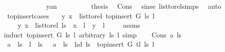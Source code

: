 \begin{isabellebody}
\ \ \ \ \isamarkupfalse%
\isanewline
\ \ \ \ \ \ \isamarkupfalse%
\ yan\isanewline
\ \ \ \ \ \ \isamarkupfalse%
\ \isamarkupfalse%
\ {\isacharquery}{\kern0pt}thesis\ \isamarkupfalse%
\ Cons\ \isamarkupfalse%
\ sinse\ list{\isacharunderscore}{\kern0pt}to{\isacharunderscore}{\kern0pt}rel{\isachardot}{\kern0pt}simps\ \isamarkupfalse%
\ auto\ \isanewline
\ \ \ \ \isamarkupfalse%
\isanewline
\ \ \isamarkupfalse%
\isanewline
{}\isamarkupfalse%
%
\endisatagproof
{\isafoldproof}%
%
\isadelimproof
\isanewline
%
\endisadelimproof
\isanewline
{}\isamarkupfalse%
\ top{\isacharunderscore}{\kern0pt}insert{\isacharunderscore}{\kern0pt}cases{\isacharcolon}{\kern0pt}\isanewline
\ \ \ {\isachardoublequoteopen}{\isacharparenleft}{\kern0pt}y{\isacharcomma}{\kern0pt}\ x{\isacharparenright}{\kern0pt}\ {\isasymin}\ list{\isacharunderscore}{\kern0pt}to{\isacharunderscore}{\kern0pt}rel\ {\isacharparenleft}{\kern0pt}top{\isacharunderscore}{\kern0pt}insert\ G\ ls\ l{\isacharparenright}{\kern0pt}{\isachardoublequoteclose}\isanewline
\ \ \ \ {\isachardoublequoteopen}{\isacharparenleft}{\kern0pt}y{\isacharcomma}{\kern0pt}\ x{\isacharparenright}{\kern0pt}\ {\isasymin}\ list{\isacharunderscore}{\kern0pt}to{\isacharunderscore}{\kern0pt}rel\ ls\ {\isasymor}\ x\ {\isacharequal}{\kern0pt}\ l\ {\isasymor}\ y\ {\isacharequal}{\kern0pt}\ l{\isachardoublequoteclose}\ \isanewline
%
\isadelimproof
\ \ %
\endisadelimproof
%
\isatagproof
{}\isamarkupfalse%
\ assms\ \isanewline
{}\isamarkupfalse%
{\isacharparenleft}{\kern0pt}induct\ {\isachardoublequoteopen}{\isacharparenleft}{\kern0pt}top{\isacharunderscore}{\kern0pt}insert\ G\ ls\ l{\isacharparenright}{\kern0pt}{\isachardoublequoteclose}\ arbitrary{\isacharcolon}{\kern0pt}\ ls\ l{\isacharcomma}{\kern0pt}\ simp{\isacharparenright}{\kern0pt}\isanewline
\ \ \isamarkupfalse%
\ {\isacharparenleft}{\kern0pt}Cons\ a\ ls{}{\isacharparenright}{\kern0pt}\isanewline
\ \ \isamarkupfalse%
\ {\isachardoublequoteopen}a\ {\isacharhash}{\kern0pt}\ ls{}\ {\isacharequal}{\kern0pt}\ l\ {\isacharhash}{\kern0pt}\ ls{\isachardoublequoteclose}\ {\isacharbar}{\kern0pt}\ \ {\isachardoublequoteopen}a\ {\isacharhash}{\kern0pt}\ ls{}\ {\isacharequal}{\kern0pt}\ {\isacharparenleft}{\kern0pt}hd\ ls{\isacharparenright}{\kern0pt}\ {\isacharhash}{\kern0pt}\ top{\isacharunderscore}{\kern0pt}insert\ G\ {\isacharparenleft}{\kern0pt}tl\ ls{\isacharparenright}{\kern0pt}\ l{\isachardoublequoteclose}\ \isanewline

\end{isabellebody}
